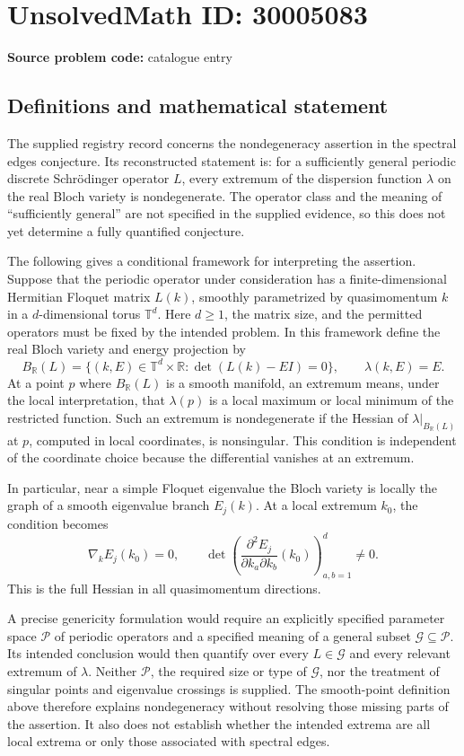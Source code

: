 \documentclass[11pt]{article}
\begin{document}
\section*{UnsolvedMath ID: 30005083}
\textbf{Source problem code:} catalogue entry
\subsection{Definitions and mathematical statement}
The supplied registry record concerns the nondegeneracy assertion in the spectral edges conjecture. Its reconstructed statement is: for a sufficiently general periodic discrete Schrödinger operator \(L\), every extremum of the dispersion function \(\lambda\) on the real Bloch variety is nondegenerate. The operator class and the meaning of ``sufficiently general'' are not specified in the supplied evidence, so this does not yet determine a fully quantified conjecture.

The following gives a conditional framework for interpreting the assertion. Suppose that the periodic operator under consideration has a finite-dimensional Hermitian Floquet matrix \(L(k)\), smoothly parametrized by quasimomentum \(k\) in a \(d\)-dimensional torus \(\mathbb T^d\). Here \(d\geq 1\), the matrix size, and the permitted operators must be fixed by the intended problem. In this framework define the real Bloch variety and energy projection by
\[
 B_{\mathbb R}(L)=\{(k,E)\in\mathbb T^d\times\mathbb R:\det(L(k)-EI)=0\},
 \qquad \lambda(k,E)=E.
\]
At a point \(p\) where \(B_{\mathbb R}(L)\) is a smooth manifold, an extremum means, under the local interpretation, that \(\lambda(p)\) is a local maximum or local minimum of the restricted function. Such an extremum is nondegenerate if the Hessian of \(\lambda|_{B_{\mathbb R}(L)}\) at \(p\), computed in local coordinates, is nonsingular. This condition is independent of the coordinate choice because the differential vanishes at an extremum.

In particular, near a simple Floquet eigenvalue the Bloch variety is locally the graph of a smooth eigenvalue branch \(E_j(k)\). At a local extremum \(k_0\), the condition becomes
\[
 \nabla_k E_j(k_0)=0,
 \qquad
 \det\!\left(\frac{\partial^2 E_j}{\partial k_a\partial k_b}(k_0)\right)_{a,b=1}^{d}\neq 0.
\]
This is the full Hessian in all quasimomentum directions.

A precise genericity formulation would require an explicitly specified parameter space \(\mathcal P\) of periodic operators and a specified meaning of a general subset \(\mathcal G\subseteq\mathcal P\). Its intended conclusion would then quantify over every \(L\in\mathcal G\) and every relevant extremum of \(\lambda\). Neither \(\mathcal P\), the required size or type of \(\mathcal G\), nor the treatment of singular points and eigenvalue crossings is supplied. The smooth-point definition above therefore explains nondegeneracy without resolving those missing parts of the assertion. It also does not establish whether the intended extrema are all local extrema or only those associated with spectral edges.
\end{document}
